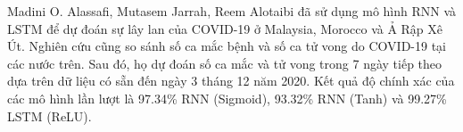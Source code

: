 Madini O. Alassafi, Mutasem Jarrah, Reem Alotaibi\cite{10263962} đã sử dụng mô hình RNN và LSTM  để dự đoán sự lây lan của COVID-19 ở Malaysia, Morocco và Ả Rập Xê Út. Nghiên cứu cũng so sánh số ca mắc bệnh và số ca tử vong do COVID-19 tại các nước trên. Sau đó, họ dự đoán số ca mắc và tử vong trong 7 ngày tiếp theo dựa trên dữ liệu có sẵn đến ngày 3 tháng 12 năm 2020. Kết quả độ chính xác của các mô hình lần lượt là 97.34\% RNN (Sigmoid), 93.32\% RNN (Tanh) và 99.27\% LSTM (ReLU). 